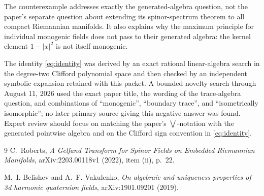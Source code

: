 \documentclass[11pt]{article}
\begin{document}
The counterexample addresses exactly the generated-algebra question, not the
paper's separate question about extending its spinor-spectrum theorem to all
compact Riemannian manifolds.  It also explains why the maximum principle for
individual monogenic fields does not pass to their generated algebra: the
kernel element \(1-|x|^2\) is not itself monogenic.

The identity \eqref{eq:identity} was derived by an exact rational linear-algebra
search in the degree-two Clifford polynomial space and then checked by an
independent symbolic expansion retained with this packet.  A bounded novelty
search through August 11, 2026 used the exact paper title, the wording of the
trace-algebra question, and combinations of ``monogenic'', ``boundary trace'',
and ``isometrically isomorphic''; no later primary source giving this negative
answer was found.  Expert review should focus on matching the paper's
\(\bigvee\)-notation with the generated pointwise algebra and on the Clifford
sign convention in \eqref{eq:identity}.

\begin{thebibliography}{9}
C.~Roberts,
\emph{A Gelfand Transform for Spinor Fields on Embedded Riemannian Manifolds},
arXiv:2203.00118v1 (2022), item (ii), p.~22.

M.~I. Belishev and A.~F. Vakulenko,
\emph{On algebraic and uniqueness properties of 3d harmonic quaternion
fields}, arXiv:1901.09201 (2019).
\end{thebibliography}
\end{document}
